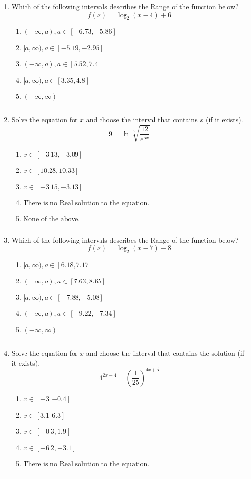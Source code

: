 \documentclass[14pt]{extbook}
\newcommand{\litem}[1]{\item#1\hspace*{-1cm}\rule{\textwidth}{0.4pt}}
\begin{document}
\begin{enumerate}
{\begin{enumerate}[label=\Alph*.]
\end{enumerate} }
\litem{
Which of the following intervals describes the Range of the function below?\[ f(x) = \log_2{(x-4)}+6 \]\begin{enumerate}[label=\Alph*.]
\item \( (-\infty, a), a \in [-6.73, -5.86] \)
\item \( [a, \infty), a \in [-5.19, -2.95] \)
\item \( (-\infty, a), a \in [5.52, 7.4] \)
\item \( [a, \infty), a \in [3.35, 4.8] \)
\item \( (-\infty, \infty) \)

\end{enumerate} }
\litem{
 Solve the equation for $x$ and choose the interval that contains $x$ (if it exists).\[  9 = \ln{\sqrt[6]{\frac{12}{e^{5x}}}} \]\begin{enumerate}[label=\Alph*.]
\item \( x \in [-3.13, -3.09] \)
\item \( x \in [10.28, 10.33] \)
\item \( x \in [-3.15, -3.13] \)
\item \( \text{There is no Real solution to the equation.} \)
\item \( \text{None of the above.} \)

\end{enumerate} }
\litem{
Which of the following intervals describes the Range of the function below?\[ f(x) = \log_2{(x-7)}-8 \]\begin{enumerate}[label=\Alph*.]
\item \( [a, \infty), a \in [6.18, 7.17] \)
\item \( (-\infty, a), a \in [7.63, 8.65] \)
\item \( [a, \infty), a \in [-7.88, -5.08] \)
\item \( (-\infty, a), a \in [-9.22, -7.34] \)
\item \( (-\infty, \infty) \)

\end{enumerate} }
\litem{
Solve the equation for $x$ and choose the interval that contains the solution (if it exists).\[ 4^{2x-4} = \left(\frac{1}{25}\right)^{4x+5} \]\begin{enumerate}[label=\Alph*.]
\item \( x \in [-3, -0.4] \)
\item \( x \in [3.1, 6.3] \)
\item \( x \in [-0.3, 1.9] \)
\item \( x \in [-6.2, -3.1] \)
\item \( \text{There is no Real solution to the equation.} \)


\end{enumerate}}
\end{enumerate}
\end{document}
